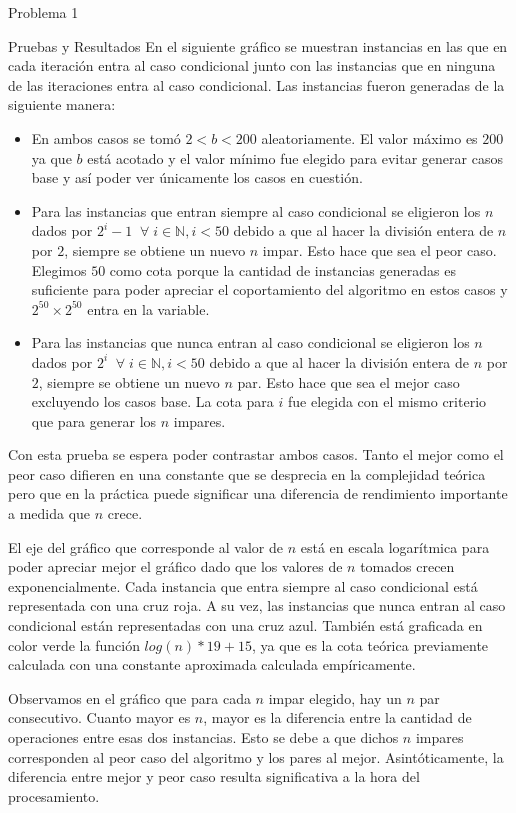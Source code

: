 \begin{section}{Problema 1}
\begin{subsection}{Pruebas y Resultados}
En el siguiente gráfico se muestran instancias en las que en cada iteración entra al caso condicional junto con las instancias que en ninguna de las iteraciones entra al caso condicional. Las instancias fueron generadas de la siguiente manera:
\begin{itemize}
	\item En ambos casos se tomó $2 < b < 200$ aleatoriamente. El valor máximo es $200$ ya que $b$ está acotado y el valor mínimo fue elegido para evitar generar casos base y así poder ver únicamente los casos en cuestión.
	\item Para las instancias que entran siempre al caso condicional se eligieron los $n$ dados por $2^i-1\;\;\forall\; i\in\mathbb{N}, i < 50$ debido a que al hacer la división entera de $n$ por $2$, siempre se obtiene un nuevo $n$ impar. Esto hace que sea el peor caso. Elegimos $50$ como cota porque la cantidad de instancias generadas es suficiente para poder apreciar el coportamiento del algoritmo en estos casos y $2^{50} \times 2^{50}$ entra en la variable.
	\item Para las instancias que nunca entran al caso condicional se eligieron los $n$ dados por $2^i\;\;\forall\; i\in\mathbb{N}, i < 50$ debido a que al hacer la división entera de $n$ por $2$, siempre se obtiene un nuevo $n$ par. Esto hace que sea el mejor caso excluyendo los casos base. La cota para $i$ fue elegida con el mismo criterio que para generar los $n$ impares.
\end{itemize}

	Con esta prueba se espera poder contrastar ambos casos. Tanto el mejor como el peor caso difieren en una constante que se desprecia en la complejidad teórica pero que en la práctica puede significar una diferencia de rendimiento importante a medida que $n$ crece.

El eje del gráfico que corresponde al valor de $n$ está en escala logarítmica para poder apreciar mejor el gráfico dado que los valores de $n$ tomados crecen exponencialmente. Cada instancia que entra siempre al caso condicional está representada con una cruz roja. A su vez, las instancias que nunca entran al caso condicional están representadas con una cruz azul. También está graficada en color verde la función $log(n)*19+15$, ya que es la cota teórica previamente calculada con una constante aproximada calculada empíricamente.\VSP
		\VSP

Observamos en el gráfico que para cada $n$ impar elegido, hay un $n$ par consecutivo. Cuanto mayor es $n$, mayor es la diferencia entre la cantidad de operaciones entre esas dos instancias. Esto se debe a que dichos $n$ impares corresponden al peor caso del algoritmo y los pares al mejor. Asintóticamente, la diferencia entre mejor y peor caso resulta significativa a la hora del procesamiento.


\end{subsection}
\end{section}
